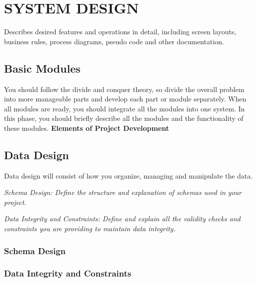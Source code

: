
\chapter{SYSTEM DESIGN} %

\label{Chapter4} %


Describes desired features and operations in detail, including screen layouts, business rules, process diagrams, pseudo code and other documentation.
\section{Basic Modules}


You should follow the divide and conquer theory, so divide the overall problem into more manageable parts and develop each part or module separately. When all modules are ready, you should integrate all the modules into one system. In this phase, you should briefly describe all the modules and the functionality of these modules.
\textbf{Elements of Project Development}

\section{Data Design}
Data design will consist of how you organize, managing and manipulate the data.

\textit{Schema Design: Define the structure and explanation of schemas used in your project.}

\textit{Data Integrity and Constraints: Define and explain all the validity checks and constraints you are providing to maintain data integrity.}

\subsection{Schema Design}

\subsection{Data Integrity and Constraints}

